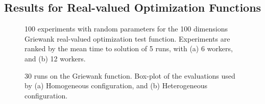 \documentclass[conference]{IEEEtran}
\begin{document}
\subsection{Results for Real-valued Optimization Functions}
%
\begin{figure}[t]
    \centering

    \caption{100 experiments with random parameters for the 100 dimensions Griewank
    real-valued optimization test function. Experiments are ranked by
    the mean time to solution of 5 runs, with (a) 6 workers, and (b) 12 workers.}
    \label{fig:griewank}
\end{figure}
%
\begin{figure}[t]
    \centering
      \caption{30 runs on the Griewank function. Box-plot of the evaluations used by (a) Homogeneous configuration, and (b) Heterogeneous configuration.}
    \label{fig:griewank-evals}
\end{figure}
\end{document}
